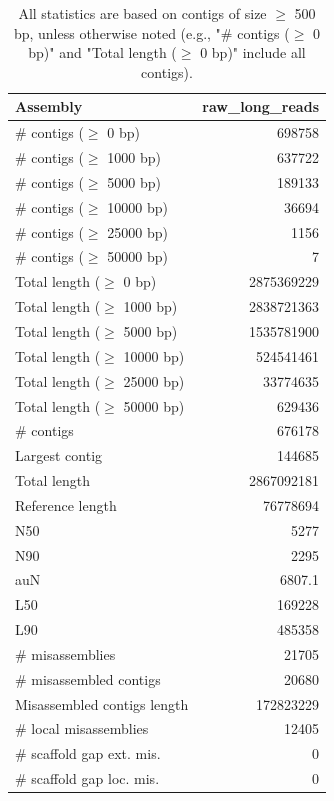 \documentclass[12pt,a4paper]{article}
\begin{document}
\begin{table}[ht]
\begin{center}
\caption{All statistics are based on contigs of size $\geq$ 500 bp, unless otherwise noted (e.g., "\# contigs ($\geq$ 0 bp)" and "Total length ($\geq$ 0 bp)" include all contigs).}
\begin{tabular}{|l*{1}{|r}|}
\hline
Assembly & raw\_long\_reads \\ \hline
\# contigs ($\geq$ 0 bp) & 698758 \\ \hline
\# contigs ($\geq$ 1000 bp) & 637722 \\ \hline
\# contigs ($\geq$ 5000 bp) & 189133 \\ \hline
\# contigs ($\geq$ 10000 bp) & 36694 \\ \hline
\# contigs ($\geq$ 25000 bp) & 1156 \\ \hline
\# contigs ($\geq$ 50000 bp) & 7 \\ \hline
Total length ($\geq$ 0 bp) & 2875369229 \\ \hline
Total length ($\geq$ 1000 bp) & 2838721363 \\ \hline
Total length ($\geq$ 5000 bp) & 1535781900 \\ \hline
Total length ($\geq$ 10000 bp) & 524541461 \\ \hline
Total length ($\geq$ 25000 bp) & 33774635 \\ \hline
Total length ($\geq$ 50000 bp) & 629436 \\ \hline
\# contigs & 676178 \\ \hline
Largest contig & 144685 \\ \hline
Total length & 2867092181 \\ \hline
Reference length & 76778694 \\ \hline
N50 & 5277 \\ \hline
N90 & 2295 \\ \hline
auN & 6807.1 \\ \hline
L50 & 169228 \\ \hline
L90 & 485358 \\ \hline
\# misassemblies & 21705 \\ \hline
\# misassembled contigs & 20680 \\ \hline
Misassembled contigs length & 172823229 \\ \hline
\# local misassemblies & 12405 \\ \hline
\# scaffold gap ext. mis. & 0 \\ \hline
\# scaffold gap loc. mis. & 0 \\ \hline

\end{tabular}
\end{center}
\end{table}
\end{document}
